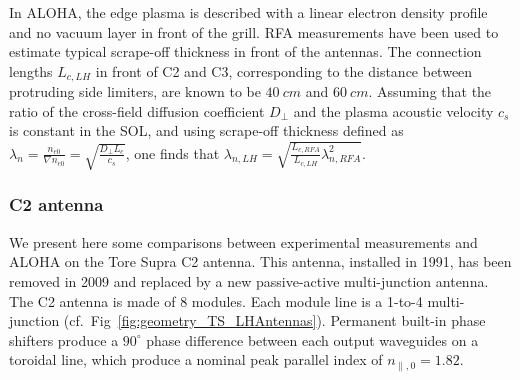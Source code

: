 
In ALOHA, the edge plasma is described with a linear electron density profile and no vacuum layer in front of the grill. RFA measurements have been used to estimate typical scrape-off thickness in front of the antennas\cite{kocan2008-1}. The connection lengths $L_{c,LH}$ in front of C2 and C3, corresponding to the distance between protruding side limiters, are known to be $40~\si{cm}$ and $60~\si{cm}$. Assuming that the ratio of the cross-field diffusion coefficient $D_\perp$ and the plasma acoustic velocity $c_s$ is constant in the SOL, and using scrape-off thickness defined as $\lambda_n=\frac{n_{e0}}{\nabla n_{e0}}=\sqrt{\frac{D_\perp L_c}{c_s}}$, one finds that $\lambda_{n,LH}=\sqrt{\frac{L_{c,RFA}}{L_{c,LH}}\lambda_{n,RFA}^2}$. 



\subsubsection{C2 antenna}
We present here some comparisons between experimental measurements and ALOHA on the Tore Supra C2 antenna. This antenna, installed in 1991, has been removed in 2009 and replaced by a new passive-active multi-junction antenna\cite{guilhem2009,guilhem2011}. The C2 antenna is made of 8 modules. Each module line is a 1-to-4 multi-junction (cf.~Fig~\ref{fig:geometry_TS_LHAntennas}). Permanent built-in phase shifters produce a $90^\circ$ phase difference between each output waveguides on a toroidal line, which produce a nominal peak parallel index of $n_{\parallel,0}=1.82$.

